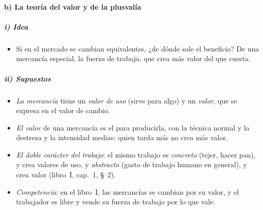 \documentclass[11pt]{article}
\begin{document}
\paragraph{b) La teoría del valor y de la plusvalía}

\subparagraph{i) Idea}
\begin{itemize}
\item Si en el mercado se cambian equivalentes, ¿de dónde sale el beneficio? De una mercancía especial, la fuerza de trabajo, que crea más valor del que cuesta.
\end{itemize}

\subparagraph{ii) Supuestos}
\begin{itemize}
\item \emph{La mercancía} tiene un \emph{valor de uso} (sirve para algo) y un \emph{valor}, que se expresa en el valor de cambio.
\item \emph{El valor} de una mercancía es el  para producirla, con la técnica normal y la destreza y la intensidad medias: quien tarda más no crea más valor\nocite{Marx1867Kapital}.
\item \emph{El doble carácter del trabajo}: el mismo trabajo es \emph{concreto} (tejer, hacer pan), y crea valores de uso, y \emph{abstracto} (gasto de trabajo humano en general), y crea valor (libro~I, cap.~1, §~2).
\item \emph{Competencia}: en el libro~I, las mercancías se cambian por su valor, y el trabajador es libre y vende su fuerza de trabajo por lo que vale.
\end{itemize}
\end{document}

